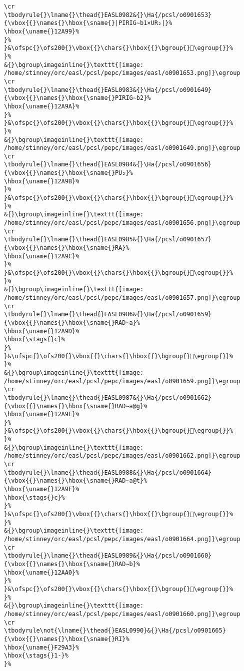 \begin{verbatim}
\cr
\tbodyrule{}\lname{}\thead{}EASL0982&{}\Ha{/pcsl/o0901653}{\vbox{{}\names{}\hbox{\sname{}|PIRIG∼b1×UR₂|}%
\hbox{\uname{}12A99}%
}%
}&\ofspc{}\ofs200{}\vbox{{}\chars{}\hbox{{}\bgroup{}𒪙\egroup{}}%
}%
&{}\bgroup\imageinline{}\texttt{[image: /home/stinney/orc/easl/pcsl/pepc/images/easl/o0901653.png]}\egroup
\cr
\tbodyrule{}\lname{}\thead{}EASL0983&{}\Ha{/pcsl/o0901649}{\vbox{{}\names{}\hbox{\sname{}PIRIG∼b2}%
\hbox{\uname{}12A9A}%
}%
}&\ofspc{}\ofs200{}\vbox{{}\chars{}\hbox{{}\bgroup{}𒪚\egroup{}}%
}%
&{}\bgroup\imageinline{}\texttt{[image: /home/stinney/orc/easl/pcsl/pepc/images/easl/o0901649.png]}\egroup
\cr
\tbodyrule{}\lname{}\thead{}EASL0984&{}\Ha{/pcsl/o0901656}{\vbox{{}\names{}\hbox{\sname{}PU₂}%
\hbox{\uname{}12A9B}%
}%
}&\ofspc{}\ofs200{}\vbox{{}\chars{}\hbox{{}\bgroup{}𒪛\egroup{}}%
}%
&{}\bgroup\imageinline{}\texttt{[image: /home/stinney/orc/easl/pcsl/pepc/images/easl/o0901656.png]}\egroup
\cr
\tbodyrule{}\lname{}\thead{}EASL0985&{}\Ha{/pcsl/o0901657}{\vbox{{}\names{}\hbox{\sname{}RA}%
\hbox{\uname{}12A9C}%
}%
}&\ofspc{}\ofs200{}\vbox{{}\chars{}\hbox{{}\bgroup{}𒪜\egroup{}}%
}%
&{}\bgroup\imageinline{}\texttt{[image: /home/stinney/orc/easl/pcsl/pepc/images/easl/o0901657.png]}\egroup
\cr
\tbodyrule{}\lname{}\thead{}EASL0986&{}\Ha{/pcsl/o0901659}{\vbox{{}\names{}\hbox{\sname{}RAD∼a}%
\hbox{\uname{}12A9D}%
\hbox{\stags{}c}%
}%
}&\ofspc{}\ofs200{}\vbox{{}\chars{}\hbox{{}\bgroup{}𒪝\egroup{}}%
}%
&{}\bgroup\imageinline{}\texttt{[image: /home/stinney/orc/easl/pcsl/pepc/images/easl/o0901659.png]}\egroup
\cr
\tbodyrule{}\lname{}\thead{}EASL0987&{}\Ha{/pcsl/o0901662}{\vbox{{}\names{}\hbox{\sname{}RAD∼a@g}%
\hbox{\uname{}12A9E}%
}%
}&\ofspc{}\ofs200{}\vbox{{}\chars{}\hbox{{}\bgroup{}𒪞\egroup{}}%
}%
&{}\bgroup\imageinline{}\texttt{[image: /home/stinney/orc/easl/pcsl/pepc/images/easl/o0901662.png]}\egroup
\cr
\tbodyrule{}\lname{}\thead{}EASL0988&{}\Ha{/pcsl/o0901664}{\vbox{{}\names{}\hbox{\sname{}RAD∼a@t}%
\hbox{\uname{}12A9F}%
\hbox{\stags{}c}%
}%
}&\ofspc{}\ofs200{}\vbox{{}\chars{}\hbox{{}\bgroup{}𒪟\egroup{}}%
}%
&{}\bgroup\imageinline{}\texttt{[image: /home/stinney/orc/easl/pcsl/pepc/images/easl/o0901664.png]}\egroup
\cr
\tbodyrule{}\lname{}\thead{}EASL0989&{}\Ha{/pcsl/o0901660}{\vbox{{}\names{}\hbox{\sname{}RAD∼b}%
\hbox{\uname{}12AA0}%
}%
}&\ofspc{}\ofs200{}\vbox{{}\chars{}\hbox{{}\bgroup{}𒪠\egroup{}}%
}%
&{}\bgroup\imageinline{}\texttt{[image: /home/stinney/orc/easl/pcsl/pepc/images/easl/o0901660.png]}\egroup
\cr
\tbodyrule\not{\lname{}\thead{}EASL0990}&{}\Ha{/pcsl/o0901665}{\vbox{{}\names{}\hbox{\sname{}RI}%
\hbox{\uname{}F29A3}%
\hbox{\stags{}1-}%
}%

\end{verbatim}

